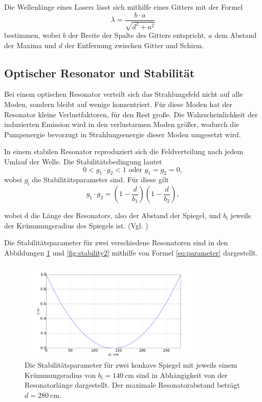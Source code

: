 Die Wellenlänge eines Lasers lässt sich mithilfe eines Gitters mit der Formel 
\begin{equation}
    \lambda = \frac{b \cdot a}{\sqrt{d^2 + a^2}}
    \label{eq:welle}
\end{equation}
bestimmen, wobei $b$ der Breite der Spalte des Gitters entspricht, $a$ dem Abstand der Maxima und $d$ der Entfernung zwischen Gitter und Schirm.

\subsection{Optischer Resonator und Stabilität}
Bei einem optischen Resonator verteilt sich das Strahlungsfeld nicht auf alle Moden, sondern bleibt auf wenige konzentriert. Für diese Moden hat der Resonator kleine Verlustfaktoren, für den Rest große. Die Wahrscheinlichkeit der induzierten Emission wird in den verlustarmen Moden größer, wodurch die Pumpenergie bevorzugt in Strahlungsenergie dieser Moden umgesetzt wird.

In einem stabilen Resonator reproduziert sich die Feldverteilung nach jedem Umlauf der Welle.
Die Stabilitätsbedingung lautet
\begin{equation}
    0 < g_1 \cdot g_2 < 1 \text{ oder } g_1 = g_2 = 0,
    \label{eq:stabilitaet}
\end{equation}
wobei $g_\text{i}$ die Stabilitätsparameter sind.
Für diese gilt
\begin{equation}
    g_1 \cdot g_2 = \left(1-\frac{d}{b_1} \right)\left(1-\frac{d}{b_2} \right),
    \label{eq:parameter}
\end{equation}

wobei d die Länge des Resonators, also der Abstand der Spiegel, und $b_\text{i}$ jeweils der Krümmungsradius des Spiegels ist.
(Vgl. \cite{Laserspektroskopie})

Die Stabilitätsparameter für zwei verschiedene Resonatoren sind in den Abbildungen \ref{fig:stability1} und \ref{fig:stability2} mithilfe von Formel \ref{eq:parameter} dargestellt.

\begin{figure}
    \centering
    \includegraphics[width=0.8\textwidth]{plots/stability1.pdf}
    \caption{Die Stabilitätsparameter für zwei konkave Spiegel mit jeweils einem Krümmungsradius von $b_\text{i} = \SI{140}{\centi\meter}$ sind in Abhängigkeit von der Resonatorlänge dargestellt. Der maximale Resonatorabstand beträgt $d = \SI{280}{\centi\meter}$.}
    \label{fig:stability1}
\end{figure}

